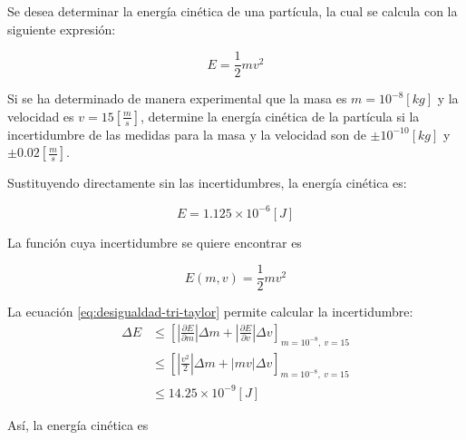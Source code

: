 \begin{ex}

    Se desea determinar la energía cinética de una partícula, la cual se
    calcula con la siguiente expresión:

    \begin{equation*}
        E = \frac{1}{2} m v^2
    \end{equation*}

    Si se ha determinado de manera experimental que la masa es \(m = 10^{-8}
    [\si{kg}]\) y la velocidad es \(v = 15 \left[\si{ \frac{m}{s} } \right]\),
    determine la energía cinética de la partícula si la incertidumbre de las
    medidas para la masa y la velocidad son de \(\pm 10^{-10} [\si{kg}]\) y
    $\pm 0.02 \left[ \si{\frac{m}{s}} \right]$.

    \begin{solution}

        Sustituyendo directamente sin las incertidumbres, la energía cinética
        es:

        \begin{equation*}
            E = 1.125 \times 10^{-6} [\si{J}]
        \end{equation*}

        La función cuya incertidumbre se quiere encontrar es

        \begin{equation*}
            E(m, v) = \frac{1}{2} m v^2
        \end{equation*}

        La ecuación \ref{eq:desigualdad-tri-taylor} permite calcular la
        incertidumbre:
        \begin{align*}
            \Delta E &\leq \left[ \left| \frac{\partial E}{\partial m}
                \right| \Delta m + \left| \frac{\partial E}{\partial v}
            \right| \Delta v \right]_{m = 10^{-8},\ v = 15}\\
                     &\leq \left[ \left| \frac{v^2}{2}
                         \right| \Delta m + \left| m v \right| \Delta v
                     \right]_{m = 10^{-8},\ v = 15} \\
                     &\leq 14.25 \times 10^{-9} [\si{J}]
            \end{align*}

            Así, la energía cinética es

            \begin{center}
            \end{center}

        \end{solution}
    \end{ex}
